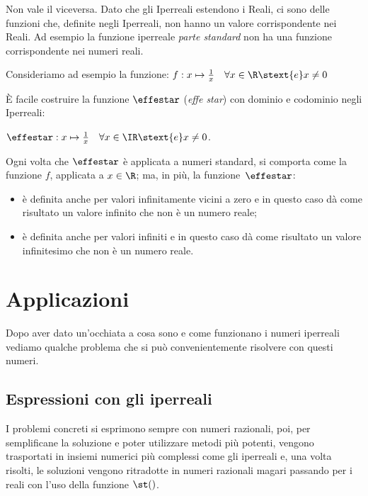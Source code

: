 \begin{osservazione}
 Non vale il viceversa. Dato che gli Iperreali estendono i Reali, ci sono 
delle funzioni che, definite negli Iperreali, non hanno un valore 
corrispondente nei Reali. Ad esempio la funzione iperreale \emph{parte 
standard} non ha una funzione corrispondente nei numeri reali.

\begin{esempio}
 Consideriamo ad esempio la funzione: 
\(f: x \mapsto \frac{1}{x} \quad \forall x \in \R \stext{e} x \ne 0\)

È facile costruire la funzione \(\effestar\) (\emph{effe star}) con 
dominio e codominio negli Iperreali:

\(\effestar: x \mapsto \frac{1}{x} \quad 
\forall x \in \IR \stext{e} x \ne 0\).

Ogni volta che \(\effestar\) è applicata a numeri standard, si 
comporta come la funzione \(f\), applicata a \(x \in \R\); 
ma, in più, la funzione~\(\effestar\):
\begin{itemize} [noitemsep]
 \item 
è definita anche per valori infinitamente vicini a zero e 
in questo caso dà come risultato un valore infinito che non è un numero 
reale;
 \item 
è definita anche per valori infiniti e
in questo caso dà come risultato un valore infinitesimo che non è un numero 
reale. 
\end{itemize}
\end{esempio}
\end{osservazione}

\section{Applicazioni}
\label{sec:insnum_applicazioni}

Dopo aver dato un'occhiata a cosa sono e come funzionano i numeri iperreali 
vediamo qualche problema che si può convenientemente risolvere con 
questi numeri.

\subsection{Espressioni con gli iperreali}
\label{subsec:insnum_espressioni}

I problemi concreti si esprimono sempre con numeri razionali, poi, per 
semplificane la soluzione e poter utilizzare metodi più potenti, vengono 
trasportati in insiemi numerici più complessi come gli iperreali e, una volta 
risolti, le soluzioni vengono ritradotte in numeri razionali magari passando 
per i reali con l'uso della funzione \(\st()\).


